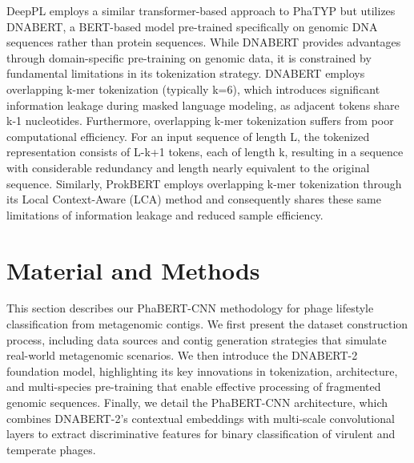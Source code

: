 \documentclass[runningheads]{llncs}
\begin{document}
DeepPL\cite{zhang2024deeppl} employs a similar transformer-based approach to PhaTYP but utilizes DNABERT\cite{ji2021dnabert}, a BERT-based model pre-trained specifically on genomic DNA sequences rather than protein sequences. While DNABERT provides advantages through domain-specific pre-training on genomic data, it is constrained by fundamental limitations in its tokenization strategy\cite{zhou2023dnabert}. DNABERT employs overlapping k-mer tokenization (typically k=6), which introduces significant information leakage during masked language modeling, as adjacent tokens share k-1 nucleotides. Furthermore, overlapping k-mer tokenization suffers from poor computational efficiency\cite{zhou2023dnabert}. For an input sequence of length L, the tokenized representation consists of L-k+1 tokens, each of length k, resulting in a sequence with considerable redundancy and length nearly equivalent to the original sequence. Similarly, ProkBERT\cite{ligeti2024prokbert} employs overlapping k-mer tokenization through its Local Context-Aware (LCA) method and consequently shares these same limitations of information leakage and reduced sample efficiency\cite{zhou2023dnabert,ligeti2024prokbert}.



\section{Material and Methods} \label{method}
This section describes our PhaBERT-CNN methodology for phage lifestyle classification from metagenomic contigs. We first present the dataset construction process, including data sources and contig generation strategies that simulate real-world metagenomic scenarios. We then introduce the DNABERT-2\cite{zhou2023dnabert} foundation model, highlighting its key innovations in tokenization, architecture, and multi-species pre-training that enable effective processing of fragmented genomic sequences. Finally, we detail the PhaBERT-CNN architecture, which combines DNABERT-2's contextual embeddings with multi-scale convolutional layers to extract discriminative features for binary classification of virulent and temperate phages.
\end{document}
